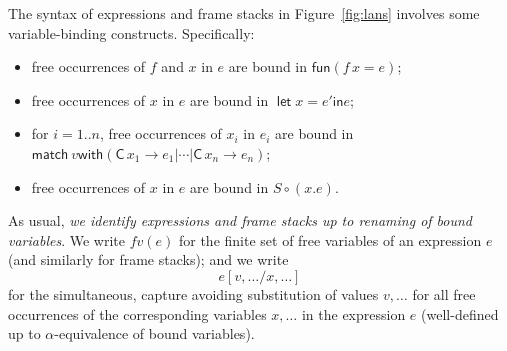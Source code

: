 \documentclass{LMCS}
\theoremstyle{plain}
\theoremstyle{definition}
\newcommand{\ALT}{\mathrel{\kw{|}}}
\newcommand{\comp}{\circ}
\newcommand{\CON}[1][C]{\kw{#1}}
\newcommand{\EQ}{\mathbin{\kw{=}}}
\renewcommand{\exp}[1][e]{#1}
\newcommand{\FUN}{\kw{fun}}
\newcommand{\fv}{\mathit{fv}}
\newcommand{\IN}{\mathrel{\kw{in}}}
\newcommand{\LET}{\mathop{\kw{let}}}
\newcommand{\kw}[1]{\mathsf{#1}}
\newcommand{\MATCH}{\kw{match}}
\newcommand{\stk}[1][S]{#1}
\newcommand{\sub}[2]{{[#2/#1]}}
\newcommand{\TO}{\mathbin{\rightarrow}}
\newcommand{\val}[1][v]{#1}
\newcommand{\vid}[1][x]{#1}
\newcommand{\WITH}{\mathbin{\kw{with}}}
\begin{document}
The syntax of expressions and frame stacks in Figure~\ref{fig:lans}
involves some variable-binding constructs. Specifically:
\begin{itemize}
\item free occurrences of $\vid[f]$ and $\vid$ in $\exp$ are bound in
  $\FUN(\vid[f]\,\vid\EQ \exp)$;

\item free occurrences of $\vid$ in $\exp$ are bound in $\LET
  {\vid\EQ\exp'} \IN \exp$;

\item for $i=1..n$, free occurrences of $\vid_i$ in $\exp_i$ are bound
  in $\MATCH\ \val \WITH
  ({\CON\,\vid_1\TO\exp_1}\ALT\cdots\ALT{\CON\,\vid_n\TO\exp_n})$;

\item free occurrences of $\vid$ in $\exp$ are bound in
  $\stk\comp(\vid.\exp)$.
\end{itemize}
As usual, \emph{we identify expressions and frame stacks up to
  renaming of bound variables}. We write $\fv(\exp)$ for the finite
set of free variables of an expression $\exp$ (and similarly for frame
stacks); and we write
\begin{equation}
  \label{eq:72}
  \exp\sub{\vid,\ldots}{\val,\ldots}
\end{equation}
for the simultaneous, capture avoiding substitution of values
$\val,\ldots$ for all free occurrences of the corresponding variables
$\vid,\ldots$ in the expression $\exp$ (well-defined up to
$\alpha$-equivalence of bound variables).
\end{document}
